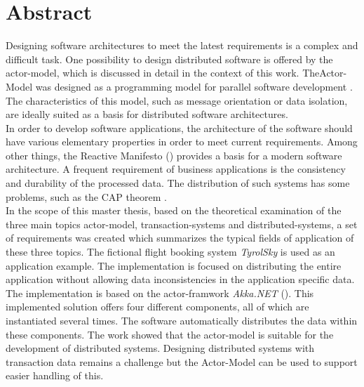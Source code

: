 
\chapter*{Abstract}
Designing software architectures to meet the latest requirements is a complex and difficult task. One possibility to design distributed software is offered by the actor-model, which is discussed in detail in the context of this work. TheActor-Model was designed as a programming model for parallel software development \citep{hewitt1973session}. The characteristics of this model, such as message orientation or data isolation, are ideally suited as a basis for distributed software architectures. \\
In order to develop software applications, the architecture of the software should have various elementary properties in order to meet current requirements. Among other things, the Reactive Manifesto (\cite{reactiveManifesto}) provides a basis for a modern software architecture. 
A frequent requirement of business applications is the consistency and durability of the processed data. The distribution of such systems has some problems, such as the CAP theorem \citep{gilbertPerspectiveCAPTheorem2012}. \\
In the scope of this master thesis, based on the theoretical examination of the three main topics actor-model, transaction-systems and distributed-systems, a set of requirements was created which summarizes the typical fields of application of these three topics. The fictional flight booking system \textit{TyrolSky} is used as an application example. The implementation is focused on distributing the entire application without allowing data inconsistencies in the application specific data. \\
The implementation is based on the actor-framwork \textit{Akka.NET} (\cite{Akka.NETCommunityAkka.NETDocumentation}). This implemented solution offers four different components, all of which are instantiated several times. The software automatically distributes the data within these components.
The work showed that the actor-model is suitable for the development of distributed systems. Designing distributed systems with transaction data remains a challenge but the Actor-Model can be used to support easier handling of this.


\cleardoublepage
{} %